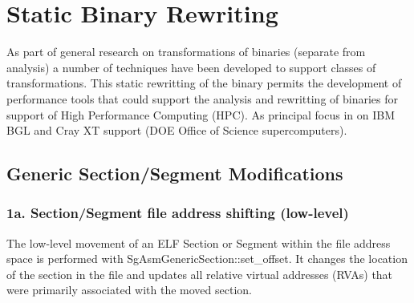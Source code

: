 \section{Static Binary Rewriting}
   As part of general research on transformations of binaries (separate from analysis)
a number of techniques have been developed to support classes of transformations.
This static rewritting of the binary permits the development of performance tools 
that could support the analysis and rewritting of binaries for support of High 
Performance Computing (HPC). As principal focus in on IBM BGL and Cray XT support 
(DOE Office of Science supercomputers).

\subsection{Generic Section/Segment Modifications}

\subsubsection{1a. Section/Segment file address shifting (low-level)}

   The low-level movement of an ELF Section or Segment within the file address space is performed with
   SgAsmGenericSection::set\_offset.  It changes the location of the section in the file and updates all relative virtual
   addresses (RVAs) that were primarily associated with the moved section.

